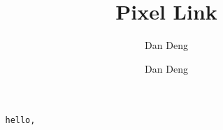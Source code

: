 \documentclass{article}
\begin{document}
\title{Pixel Link}
\author{Dan Deng \and Dan Deng}
\date{}
\maketitle

\verb*|   hello,   |
\end{document}
